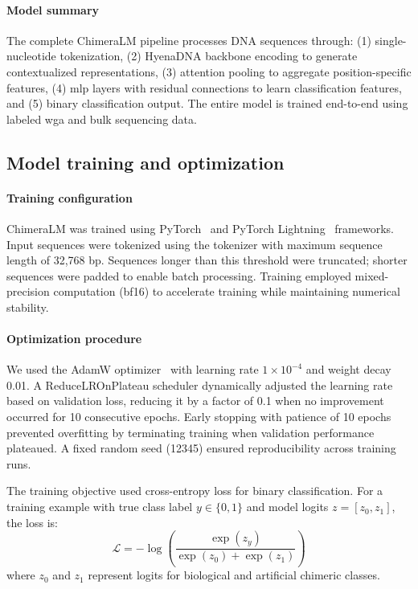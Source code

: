 \documentclass[pdflatex,sn-nature,lineno]{sn-jnl}%
\theoremstyle{thmstyleone}%
\theoremstyle{thmstyletwo}%
\theoremstyle{thmstylethree}%
\begin{document}
\paragraph{Model summary}
The complete ChimeraLM pipeline processes DNA sequences through: (1) single-nucleotide tokenization, (2) HyenaDNA backbone encoding to generate contextualized representations, (3) attention pooling to aggregate position-specific features, (4) \gls{mlp} layers with residual connections to learn classification features, and (5) binary classification output. 
The entire model is trained end-to-end using labeled \gls{wga} and bulk sequencing data.


\subsection*{Model training and optimization}

\paragraph{Training configuration}
ChimeraLM was trained using PyTorch~\cite{paszke2019pytorch} and PyTorch Lightning~\cite{Falcon_PyTorch_Lightning_2019} frameworks.
Input sequences were tokenized using the tokenizer with maximum sequence length of 32,768 bp.
Sequences longer than this threshold were truncated; shorter sequences were padded to enable batch processing. 
Training employed mixed-precision computation (bf16) to accelerate training while maintaining numerical stability.

\paragraph{Optimization procedure}
We used the AdamW optimizer~\cite{adamw} with learning rate $1 \times 10^{-4}$ and weight decay 0.01.
A ReduceLROnPlateau scheduler dynamically adjusted the learning rate based on validation loss, reducing it by a factor of 0.1 when no improvement occurred for 10 consecutive epochs.
Early stopping with patience of 10 epochs prevented overfitting by terminating training when validation performance plateaued. 
A fixed random seed (12345) ensured reproducibility across training runs.

The training objective used cross-entropy loss for binary classification. For a training example with true class label $y \in \{0,1\}$ and model logits $z = [z_0, z_1]$, the loss is:
$$
\mathcal{L} = -\log\left(\frac{\exp(z_y)}{\exp(z_0) + \exp(z_1)}\right)
$$
where $z_0$ and $z_1$ represent logits for biological and artificial chimeric classes.
\end{document}
